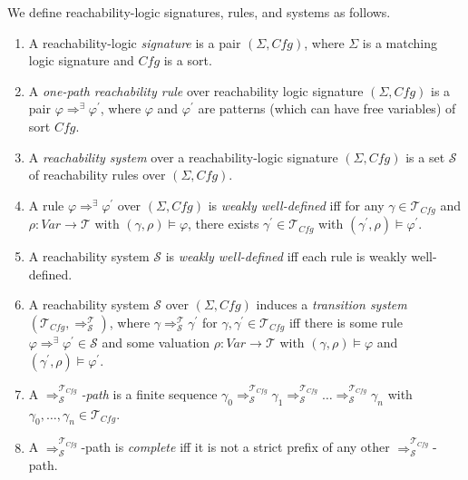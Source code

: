 \documentclass{article}
\newcommand{\Var}{\mathit{Var}}
\newcommand{\Tcfg}{\mathcal{T}_{\mathit{Cfg}}}
\begin{document}
\begin{definition}
We define reachability-logic signatures, rules, and systems as follows.
\begin{enumerate}
    \item A reachability-logic \emph{signature} is a pair $(\Sigma, \mathit{Cfg})$,
          where $\Sigma$ is a matching logic signature and $\mathit{Cfg}$ is a sort.
          
    \item A \emph{one-path reachability rule} over reachability logic signature $(\Sigma, \mathit{Cfg})$        is a pair $\varphi \Rightarrow^\exists \varphi^\prime$,
          where $\varphi$ and $\varphi^\prime$
          are patterns (which can have free variables) of sort $\mathit{Cfg}$.
          
    \item A \emph{reachability system} over a reachability-logic signature $(\Sigma, \mathit{Cfg})$
          is a set $\mathcal{S}$ of reachability rules over $(\Sigma, \mathit{Cfg})$.
          
    \item A rule $\varphi \Rightarrow^\exists \varphi^\prime$ over $(\Sigma, \mathit{Cfg})$
          is \emph{weakly well-defined} iff
          for any $\gamma \in \Tcfg$ and $\rho : \Var \to \mathcal{T}$
          with $(\gamma, \rho) \vDash \varphi$,
          there exists $\gamma^\prime \in \Tcfg$ with $(\gamma^\prime , \rho) \vDash \varphi^\prime$.
          
    \item A reachability system $\mathcal{S}$ is \emph{weakly well-defined} iff each rule is weakly     
          well-defined.
          
    \item A reachability system $\mathcal{S}$ over $(\Sigma, \mathit{Cfg})$ induces
          a \emph{transition system} \\
          $(\Tcfg , \Rightarrow^{\mathcal{T}}_{\mathcal{S}})$,
          where $\gamma \Rightarrow^{\mathcal{T}}_{\mathcal{S}} \gamma^\prime$
          for $\gamma, \gamma^\prime \in \Tcfg$
          iff there is some rule \\ $\varphi \Rightarrow^\exists \varphi^\prime \in \mathcal{S}$
          and some valuation $\rho : \Var \to \mathcal{T}$ with $(\gamma, \rho) \vDash \varphi$
          and $(\gamma^\prime , \rho) \vDash \varphi^\prime$.
          
    \item A \emph{$\Rightarrow^{\Tcfg}_{\mathcal{S}}$-path} is a finite
          sequence $\gamma_0 \Rightarrow^{\Tcfg}_{\mathcal{S}} \gamma_1 \Rightarrow^{\Tcfg}_{\mathcal{S}} \ldots \Rightarrow^{\Tcfg}_{\mathcal{S}} \gamma_n$
          with $\gamma_0,\ldots,\gamma_n \in \Tcfg$.
          
    \item A $\Rightarrow^{\Tcfg}_{\mathcal{S}}$-path is \emph{complete}
          iff it is not a strict prefix of any
          other $\Rightarrow^{\Tcfg}_{\mathcal{S}}$-path.
\end{enumerate}

\end{definition}
\end{document}
